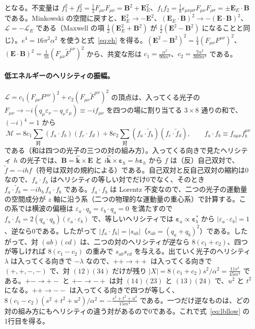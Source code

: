 \documentclass[a4paper,10pt]{ltjsarticle}
\begin{document}
となる。不変量は $f_1^2+f_2^2=\frac12F_{\mu\nu}F_{\mu\nu}=\boldsymbol B^2+\boldsymbol E_E^2$、$f_1f_2=\frac18\epsilon_{\mu\nu\rho\sigma}F_{\mu\nu}F_{\rho\sigma}=\pm\boldsymbol E_E\cdot\boldsymbol B$ である。Minkowski の空間に戻すと、$\boldsymbol E_E^2\to-\boldsymbol E^2$、$(\boldsymbol E_E\cdot\boldsymbol B)^2\to-(\boldsymbol E\cdot\boldsymbol B)^2$、$\mathcal L=-\mathcal L_E$ である（Maxwell の項 $\frac12(\boldsymbol E_E^2+\boldsymbol B^2)$ が $\frac12(\boldsymbol E^2-\boldsymbol B^2)$ になることと同じ）。$e^4=16\pi^2\alpha^2$ を使うと式~\eqref{eq:eh} を得る。$(\boldsymbol E^2-\boldsymbol B^2)^2=\frac14(F_{\mu\nu}F^{\mu\nu})^2$、$(\boldsymbol E\cdot\boldsymbol B)^2=\frac1{16}(F_{\mu\nu}\tilde F^{\mu\nu})^2$ から、共変な形は $c_1=\frac{\alpha^2}{90m^4}$、$c_2=\frac{7\alpha^2}{360m^4}$ である。

\paragraph{低エネルギーのヘリシティの振幅。}$\mathcal L=c_1(F_{\mu\nu}F^{\mu\nu})^2+c_2(F_{\mu\nu}\tilde F^{\mu\nu})^2$ の頂点は、入ってくる光子の $F_{\mu\nu}\to-i(q_\mu\varepsilon_\nu-q_\nu\varepsilon_\mu)\equiv-if_{\mu\nu}$ を四つの場に割り当てる $3\times8$ 通りの和で、$(-i)^4=1$ から
\begin{equation*}
\mathcal M=8c_1\sum_{\text{対}}(f_a\cdot f_b)(f_c\cdot f_d)+8c_2\sum_{\text{対}}(f_a\cdot\tilde f_b)(f_c\cdot\tilde f_d),\qquad f_a\cdot f_b\equiv f_{a\mu\nu}f_b^{\mu\nu}
\end{equation*}
である（和は四つの光子の三つの対の組み方）。入ってくる向きで見たヘリシティ $h$ の光子では、$\boldsymbol B=\hat{\boldsymbol k}\times\boldsymbol E$ と $i\hat{\boldsymbol k}\times\boldsymbol\varepsilon_h=h\boldsymbol\varepsilon_h$ から $f$ は（反）自己双対で、$\tilde f=-ihf$（符号は双対の規約による）である。自己双対と反自己双対の縮約は0なので、$f_a\cdot f_b$ はヘリシティの等しい対でだけ0でなく、そのとき $f_a\cdot\tilde f_b=-ih_b\,f_a\cdot f_b$ である。$f_a\cdot f_b$ は Lorentz 不変なので、二つの光子の運動量の空間成分が $z$ 軸に沿う系（二つの物理的な運動量の重心系）で計算する。この系では横波の偏極は $\varepsilon_a\cdot q_b=\varepsilon_b\cdot q_a=0$ を満たすので $f_a\cdot f_b=2(q_a\cdot q_b)(\varepsilon_a\cdot\varepsilon_b)$ で、等しいヘリシティでは $\boldsymbol\varepsilon_a\propto\boldsymbol\varepsilon_b^*$ から $|\varepsilon_a\cdot\varepsilon_b|=1$、逆なら0である。したがって $|f_a\cdot f_b|=|s_{ab}|$（$s_{ab}=(q_a+q_b)^2$）である。したがって、対 $(ab)(cd)$ は、二つの対のヘリシティが逆なら $8(c_1+c_2)$、四つが等しければ $8(c_1-c_2)$ の重みで $s_{ab}s_{cd}$ を与える。出ていく光子のヘリシティ $\lambda$ は入ってくる向きで $-\lambda$ なので、$++\to++$ は入ってくる向きで $(+,+,-,-)$ で、対 $(12)(34)$ だけが残り $|X|=8(c_1+c_2)s^2/\alpha^2=\frac{11s^2}{45m^4}$ である。$+-\to+-$ と $+-\to-+$ は対 $(14)(23)$ と $(13)(24)$ で、$u^2$ と $t^2$ になる。$++\to--$ は入ってくる向きで四つが等しく、$8(c_1-c_2)(s^2+t^2+u^2)/\alpha^2=-\frac{s^2+t^2+u^2}{15m^4}$ である。一つだけ逆なものは、どの対の組み方にもヘリシティの違う対があるので0である。これで式~\eqref{eq:lbllow} の1行目を得る。
\end{document}
